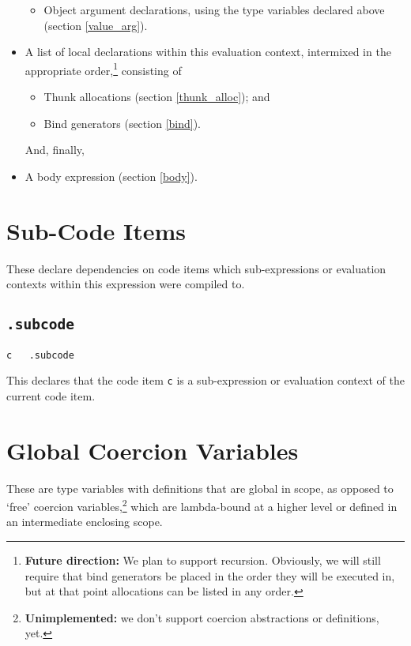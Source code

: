 \documentclass{report}
\newcommand\stringcode[1]{\texttt{#1}}
\newcommand\unimpl[1]{\footnote{\textbf{Unimplemented: }#1}}
\newcommand\future[1]{\footnote{\textbf{Future direction:} #1}}
\begin{document}
\begin{itemize}
\begin{itemize}
            \item Object argument declarations, using the type variables declared above (section \ref{value_arg}).
        \end{itemize}
    \item A list of local declarations within this evaluation context,
        intermixed in the appropriate order,\future{We plan to support recursion.
            Obviously, we will still require that bind generators be placed in the order they will be executed in,
            but at that point allocations can be listed in any order.
        }
        consisting of
        \begin{itemize}
            \item Thunk allocations (section \ref{thunk_alloc}); and
            \item Bind generators (section \ref{bind}).
        \end{itemize}
        And, finally,
    \item A body expression (section \ref{body}).
\end{itemize}

\section{Sub-Code Items}
\label{subcode}

These declare dependencies on code items which sub-expressions or evaluation contexts within this expression were compiled to.

\subsection{\stringcode{.subcode}}

\begin{verbatim}
c	.subcode
\end{verbatim}

This declares that the code item \stringcode{c} is a sub-expression or evaluation context of the current code item.

\section{Global Coercion Variables}
\label{coercion_gvar}

These are type variables with definitions that are global in scope,
as opposed to `free' coercion variables,\unimpl{we don't support coercion abstractions or definitions, yet.}
which are lambda-bound at a higher level or defined in an intermediate enclosing scope.
\end{document}
